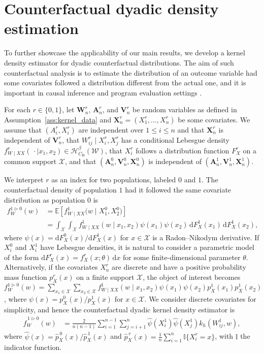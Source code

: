 \documentclass[11pt,lof]{puthesis}
\newcommand{\E}{\ensuremath{\mathbb{E}}}
\newcommand{\I}{\ensuremath{\mathbb{I}}}
\newcommand{\rH}{\ensuremath{\mathrm{H}}}
\newcommand{\bW}{\ensuremath{\mathbf{W}}}
\newcommand{\bX}{\ensuremath{\mathbf{X}}}
\newcommand{\bA}{\ensuremath{\mathbf{A}}}
\newcommand{\bV}{\ensuremath{\mathbf{V}}}
\newcommand{\cH}{\ensuremath{\mathcal{H}}}
\newcommand{\cX}{\ensuremath{\mathcal{X}}}
\newcommand{\cW}{\ensuremath{\mathcal{W}}}
\newcommand{\diff}[1]{\,\mathrm{d}#1}
\theoremstyle{break}
\theoremstyle{proof}
\begin{document}
\section{Counterfactual dyadic density estimation}
\label{sec:kernel_counterfactual}

To further showcase the applicability of our main results, we develop a kernel
density estimator for dyadic counterfactual distributions. The aim of such
counterfactual analysis is to estimate the distribution of an outcome variable
had some covariates followed a distribution different from the actual one, and
it is important in causal inference and program evaluation settings
\citep{dinardo1996distribution,chernozhukov2013inference}.

For each $r \in \{0,1\}$, let $\bW_n^r$, $\bA_n^r$, and $\bV_n^r$ be random
variables as defined in Assumption~\ref{ass:kernel_data} and
$\bX_n^r = (X_1^r, \ldots, X_n^r)$ be some covariates.
We assume that $(A_i^r, X_i^r)$ are independent over $1 \leq i \leq n$
and that $\bX_n^r$ is independent of $\bV_n^r$, that
$W_{i j}^r \mid X_i^r, X_j^r$ has a conditional Lebesgue density
$f_{W \mid XX}^r(\,\cdot \mid x_1, x_2) \in \cH^\beta_{C_\rH}(\cW)$,
that $X_i^r$ follows a distribution function $F_X^r$ on a common support $\cX$,
and that $(\bA_n^0, \bV_n^0, \bX_n^0)$
is independent of $(\bA_n^1, \bV_n^1, \bX_n^1)$.

We interpret $r$ as an index for two populations, labeled $0$ and $1$. The
counterfactual density of population $1$ had it followed the
same covariate distribution as population $0$ is
%
\begin{align*}
f_W^{1 \triangleright 0}(w)
&= \E\left[ f_{W \mid XX}^1\big(w \mid X_1^0, X_2^0\big) \right] \\
&= \int_{\cX} \int_{\cX} f_{W \mid XX}^{1}(w \mid x_1, x_2)
\psi(x_1) \psi(x_2) \diff F_X^{1}(x_1) \diff F_X^{1}(x_2),
\end{align*}
%
where $\psi(x) = \mathrm{d} F_X^0(x) / \mathrm{d} F_X^1(x)$ for $x \in \cX$
is a Radon--Nikodym derivative. If $X^0_i$ and $X^1_i$ have Lebesgue densities,
it is natural to consider a parametric model of the form
$\mathrm{d} F_X^{r}(x)=f_X^r(x;\theta)\diff x$
for some finite-dimensional parameter $\theta$.
Alternatively, if the covariates $X_n^r$ are discrete and have a positive
probability mass function $p_X^r(x)$ on a finite
support $\cX$, the object of interest becomes
$f_W^{1 \triangleright 0}(w)
= \sum_{x_1 \in \cX} \sum_{x_2 \in \cX}
f_{W \mid XX}^{1}(w \mid x_1, x_2) \psi(x_1) \psi(x_2)
p_X^{1}(x_1) p_X^{1}(x_2)$,
where $\psi(x) = p_X^0(x)/p_X^1(x)$ for $x \in \cX$.
We consider discrete covariates for simplicity,
and hence the counterfactual dyadic kernel density estimator is
%
\begin{align*}
\hat f_W^{\,1 \triangleright 0}(w)
&= \frac{2}{n(n-1)} \sum_{i=1}^{n-1} \sum_{j=i+1}^n
\hat \psi(X_i^1) \hat \psi(X_j^1) k_h(W_{i j}^1, w),
\end{align*}
%
where $\hat\psi(x) = \hat p_X^{\,0}(x) / \hat p_X^{\,1}(x)$ and
$\hat p_X^{\,r}(x) = \frac{1}{n}\sum_{i = 1}^n \I\{X_i^r = x\}$,
with $\I$ the indicator function.
\end{document}
